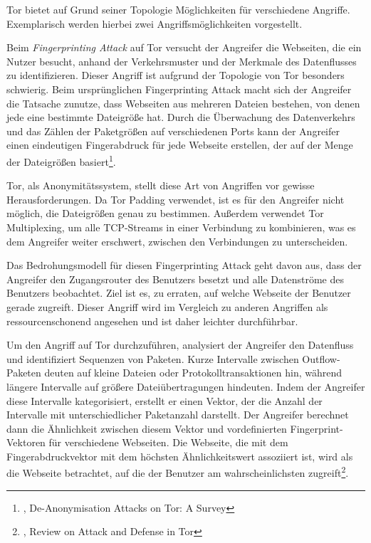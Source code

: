 Tor bietet auf Grund seiner Topologie Möglichkeiten für verschiedene Angriffe. Exemplarisch werden hierbei zwei Angriffsmöglichkeiten vorgestellt.

Beim \textit{Fingerprinting Attack} auf Tor versucht der Angreifer die Webseiten, die ein Nutzer besucht, anhand der Verkehrsmuster und der Merkmale des Datenflusses zu identifizieren. Dieser Angriff ist aufgrund der Topologie von Tor besonders schwierig. Beim ursprünglichen Fingerprinting Attack macht sich der Angreifer die Tatsache zunutze, dass Webseiten aus mehreren Dateien bestehen, von denen jede eine bestimmte Dateigröße hat. Durch die Überwachung des Datenverkehrs und das Zählen der Paketgrößen auf verschiedenen Ports kann der Angreifer einen eindeutigen Fingerabdruck für jede Webseite erstellen, der auf der Menge der Dateigrößen basiert\footnote{\cite{AttacksOnTor}, De-Anonymisation Attacks on Tor: A Survey}.

Tor, als Anonymitätssystem, stellt diese Art von Angriffen vor gewisse Herausforderungen. Da Tor Padding verwendet, ist es für den Angreifer nicht möglich, die Dateigrößen genau zu bestimmen. Außerdem verwendet Tor Multiplexing, um alle TCP-Streams in einer Verbindung zu kombinieren, was es dem Angreifer weiter erschwert, zwischen den Verbindungen zu unterscheiden.

Das Bedrohungsmodell für diesen Fingerprinting Attack geht davon aus, dass der Angreifer den Zugangsrouter des Benutzers besetzt und alle Datenströme des Benutzers beobachtet. Ziel ist es, zu erraten, auf welche Webseite der Benutzer gerade zugreift. Dieser Angriff wird im Vergleich zu anderen Angriffen als ressourcenschonend angesehen und ist daher leichter durchführbar.

Um den Angriff auf Tor durchzuführen, analysiert der Angreifer den Datenfluss und identifiziert Sequenzen von Paketen. Kurze Intervalle zwischen Outflow-Paketen deuten auf kleine Dateien oder Protokolltransaktionen hin, während längere Intervalle auf größere Dateiübertragungen hindeuten. Indem der Angreifer diese Intervalle kategorisiert, erstellt er einen Vektor, der die Anzahl der Intervalle mit unterschiedlicher Paketanzahl darstellt. Der Angreifer berechnet dann die Ähnlichkeit zwischen diesem Vektor und vordefinierten Fingerprint-Vektoren für verschiedene Webseiten. Die Webseite, die mit dem Fingerabdruckvektor mit dem höchsten Ähnlichkeitswert assoziiert ist, wird als die Webseite betrachtet, auf die der Benutzer am wahrscheinlichsten zugreift\footnote{\cite{AttackInTor}, Review on Attack and Defense in Tor}.

